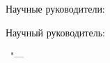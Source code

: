 %
\vspace{0pt plus4fill} %
\begin{flushright}
\ifdefined\supervisorTwoFio
Научные руководители:

\supervisorRegalia

\ifdefined\supervisorDead
\framebox{\supervisorFio}
\else
\supervisorFio
\fi

\supervisorTwoRegalia

\ifdefined\supervisorTwoDead
\framebox{\supervisorTwoFio}
\else
\supervisorTwoFio
\fi
\else
Научный руководитель:

\supervisorRegalia

\ifdefined\supervisorDead
\framebox{\supervisorFio}
\else
\supervisorFio
\fi
\fi

\end{flushright}
%
\vspace{0pt plus4fill} %
{\centering\thesisCity\ "--- \thesisYear\par}
